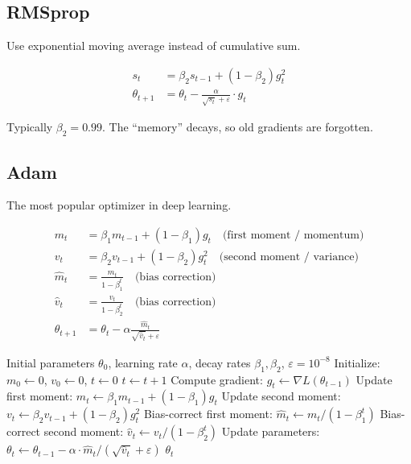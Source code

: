 \subsection{RMSprop}

 Use exponential moving average instead of cumulative sum.

\begin{align}
    s_t &= \beta_2 s_{t-1} + (1 - \beta_2) g_t^2 \\
    \theta_{t+1} &= \theta_t - \frac{\alpha}{\sqrt{s_t} + \varepsilon} \cdot g_t
\end{align}

Typically $\beta_2 = 0.99$. The ``memory'' decays, so old gradients are forgotten.


\subsection{Adam}

 The most popular optimizer in deep learning.

\begin{align}
    m_t &= \beta_1 m_{t-1} + (1 - \beta_1) g_t \quad \text{(first moment / momentum)} \\
    v_t &= \beta_2 v_{t-1} + (1 - \beta_2) g_t^2 \quad \text{(second moment / variance)} \\
    \hat{m}_t &= \frac{m_t}{1 - \beta_1^t} \quad \text{(bias correction)} \\
    \hat{v}_t &= \frac{v_t}{1 - \beta_2^t} \quad \text{(bias correction)} \\
    \theta_{t+1} &= \theta_t - \alpha \frac{\hat{m}_t}{\sqrt{\hat{v}_t} + \varepsilon}
\end{align}


\begin{algorithm}[H]
\caption{Adam Optimizer}
\begin{algorithmic}[1]
    \Require Initial parameters $\theta_0$, learning rate $\alpha$, decay rates $\beta_1, \beta_2$, $\varepsilon = 10^{-8}$
    \State Initialize: $m_0 \gets 0$, $v_0 \gets 0$, $t \gets 0$
        \State $t \gets t + 1$
        \State Compute gradient: $g_t \gets \nabla L(\theta_{t-1})$
        \State Update first moment: $m_t \gets \beta_1 m_{t-1} + (1-\beta_1) g_t$
        \State Update second moment: $v_t \gets \beta_2 v_{t-1} + (1-\beta_2) g_t^2$
        \State Bias-correct first moment: $\hat{m}_t \gets m_t / (1 - \beta_1^t)$
        \State Bias-correct second moment: $\hat{v}_t \gets v_t / (1 - \beta_2^t)$
        \State Update parameters: $\theta_t \gets \theta_{t-1} - \alpha \cdot \hat{m}_t / (\sqrt{\hat{v}_t} + \varepsilon)$
    \EndWhile
    \Return $\theta_t$
\end{algorithmic}
\end{algorithm}


